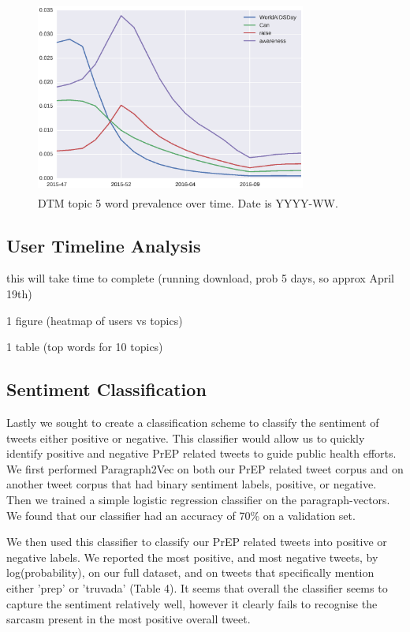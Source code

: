 \documentclass{sig-alternate-05-2015}
\begin{document}
\begin{figure}
\centering
\includegraphics[height=2.5in, width=3.5in]{DTMfig2}
\caption{DTM topic 5 word prevalence over time. Date is YYYY-WW.}
\end{figure}

\subsection{User Timeline Analysis}

 this will take time to complete (running download, prob 5 days, so approx April 19th)

1 figure (heatmap of users vs topics)

1 table (top words for 10 topics)

\subsection{Sentiment Classification}


Lastly we sought to create a classification scheme to classify the sentiment of tweets either positive or negative. This classifier would allow us to quickly identify positive and negative PrEP related tweets to guide public health efforts. We first performed Paragraph2Vec on both our PrEP related tweet corpus and on another tweet corpus that had binary sentiment labels, positive, or negative. Then we trained a simple logistic regression classifier on the paragraph-vectors. We found that our classifier had an accuracy of 70\% on a validation set.

We then used this classifier to classify our PrEP related tweets into positive or negative labels. We reported the most positive, and most negative tweets, by log(probability), on our full dataset, and on tweets that specifically mention either 'prep' or 'truvada' (Table 4). It seems that overall the classifier seems to capture the sentiment relatively well, however it clearly fails to recognise the sarcasm present in the most positive overall tweet.
\end{document}
